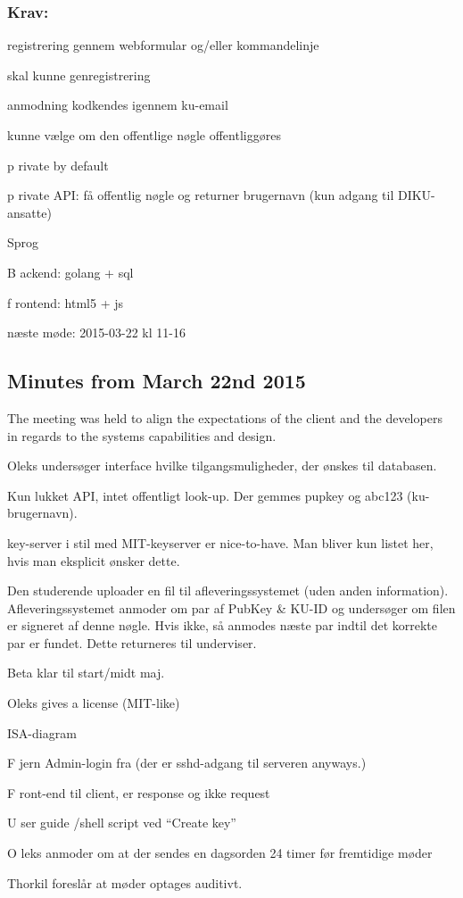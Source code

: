 \documentclass[11pt,a4paper]{report}
\let\OldItem\item
\newcommand{\SubItemStart}[1]{%
    \let\item\SubItemEnd
    \begin{SubItemList}[resume]%
        \OldItem #1%
}
\newcommand{\SubItemMiddle}[1]{%
    \OldItem #1%
}
\newcommand{\SubItemEnd}[1]{%
    \end{SubItemList}%
    \let\item\OldItem
    \item #1%
}
\newcommand*{\SubItem}[1]{%
    \let\SubItem\SubItemMiddle%
    \SubItemStart{#1}%
}%
\begin{document}
\subsubsection{Krav:}
\begin{itemize}
\item registrering gennem webformular og/eller kommandelinje
\item skal kunne genregistrering
\item anmodning kodkendes igennem ku-email
\item kunne vælge om den offentlige nøgle offentliggøres
\SubItem private by default
\item private API: få offentlig nøgle og returner brugernavn (kun adgang til DIKU-ansatte)
\item Sprog
\SubItem Backend: golang + sql
\SubItem frontend: html5 + js
\end{itemize}

næste møde:
2015-03-22 kl 11-16

\subsection{Minutes from March 22nd 2015}
The meeting was held to align the expectations of the client and the developers in regards to the systems capabilities and design.

\begin{itemize}
\item Oleks undersøger interface hvilke tilgangsmuligheder, der ønskes til databasen.
\item Kun lukket API, intet offentligt look-up. Der gemmes pupkey og abc123 (ku-brugernavn).
\item key-server i stil med MIT-keyserver er nice-to-have. Man bliver kun listet her, hvis man eksplicit ønsker dette.
\item Den studerende uploader en fil til afleveringssystemet (uden anden information). Afleveringssystemet anmoder om par af PubKey \& KU-ID og undersøger om filen er signeret af denne nøgle. Hvis ikke, så anmodes næste par indtil det korrekte par er fundet. Dette returneres til underviser.
\item Beta klar til start/midt maj.
\item Oleks gives a license (MIT-like)
\item ISA-diagram
\SubItem Fjern Admin-login fra (der er sshd-adgang til serveren anyways.)
\SubItem Front-end til client, er response og ikke request
\SubItem User guide /shell script ved ``Create key''
\item Oleks anmoder om at der sendes en dagsorden 24 timer før fremtidige møder
\item Thorkil foreslår at møder optages auditivt.
\end{itemize}
\end{document}
